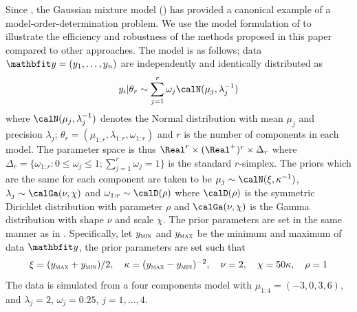 Since \cite{Richardson:1997ea}, the Gaussian mixture model (\gmm) has
provided a canonical example of a model-order-determination problem. We use
the model formulation of \cite{DelMoral:2006hc} to illustrate the efficiency
and robustness of the methods proposed in this paper compared to other
approaches. The model is as follows; data $\data = (y_1,\dots,y_n)$ are
independently and identically distributed as
\begin{equation*}
  y_i|\theta_r \sim \sum_{j=1}^r \omega_j\calN(\mu_j,\lambda_j^{-1})
\end{equation*}
where $\calN(\mu_j,\lambda_j^{-1})$ denotes the Normal distribution with mean
$\mu_j$ and precision $\lambda_j$; $\theta_r =
(\mu_{1:r},\lambda_{1:r},\omega_{1:r})$ and $r$ is the number of components in
each model. The parameter space is thus $\Real^r \times (\Real^{+})^r\times
\Delta_r$ where $\Delta_r = \{\omega_{1:r}:0\le\omega_j\le1;
\sum_{j=1}^r\omega_j=1\}$ is the standard $r$-simplex. The priors which are
the same for each component are taken to be $\mu_j\sim\calN(\xi,\kappa^{-1})$,
$\lambda_j\sim\calGa(\nu,\chi)$ and $\omega_{1:r}\sim\calD(\rho)$ where
$\calD(\rho)$ is the symmetric Dirichlet distribution with parameter $\rho$
and $\calGa(\nu,\chi)$ is the Gamma distribution with shape $\nu$ and scale
$\chi$. The prior parameters are set in the same manner as in
\cite{Richardson:1997ea}. Specifically, let $y_{\text{\textsc{min}}}$ and
$y_{\text{\textsc{max}}}$ be the minimum and maximum of data $\data$, the
prior parameters are set such that
\begin{equation*}
  \xi = (y_{\text{\textsc{max}}} + y_{\text{\textsc{min}}}) / 2, \quad
  \kappa = (y_{\text{\textsc{max}}} - y_{\text{\textsc{min}}})^{-2}, \quad
  \nu = 2, \quad \chi = 50\kappa, \quad \rho = 1
\end{equation*}
The data is simulated from a four components model with $\mu_{1:4} = (-3, 0,3,
6)$, and $\lambda_j =2$, $\omega_j = 0.25$, $j = 1,\dots,4$.

